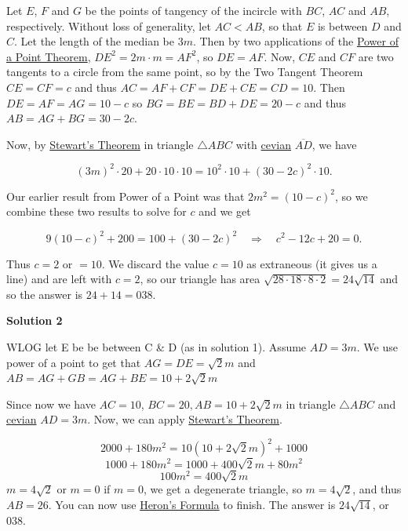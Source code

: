 \begin{enumerate}
 Let $E$, $F$ and $G$ be the points of tangency of the incircle with $BC$, $AC$ and $AB$, respectively.  Without loss of generality, let $AC < AB$, so that $E$ is between $D$ and $C$.  Let the length of the median be $3m$.  Then by two applications of the \href{https://artofproblemsolving.com/wiki/index.php?title=Power\_of\_a\_Point\_Theorem}{Power of a Point Theorem}, $DE^2 = 2m \cdot m = AF^2$, so $DE = AF$.  Now, $CE$ and $CF$ are two tangents to a circle from the same point, so by the Two Tangent Theorem $CE = CF = c$ and thus $AC = AF + CF = DE + CE = CD = 10$.  Then $DE = AF = AG = 10 - c$ so $BG = BE = BD + DE = 20 - c$ and thus $AB = AG + BG = 30 - 2c$.

 Now, by \href{https://artofproblemsolving.com/wiki/index.php?title=Stewart\%27s\_Theorem}{Stewart's Theorem} in triangle $\triangle ABC$ with \href{https://artofproblemsolving.com/wiki/index.php?title=Cevian}{cevian} $\overline{AD}$, we have

 
 \[(3m)^2\cdot 20 + 20\cdot10\cdot10 = 10^2\cdot10 + (30 - 2c)^2\cdot 10.\]

 Our earlier result from Power of a Point was that $2m^2 = (10 - c)^2$, so we combine these two results to solve for $c$ and we get

 
 \[9(10 - c)^2 + 200 = 100 + (30 - 2c)^2 \quad \Longrightarrow \quad c^2 - 12c + 20 = 0.\]

 Thus $c = 2$ or $= 10$.  We discard the value $c = 10$ as extraneous (it gives us a line) and are left with $c = 2$, so our triangle has area $\sqrt{28 \cdot 18 \cdot 8 \cdot 2} = 24\sqrt{14}$ and so the answer is $24 + 14 = \boxed{038}$.

 



\textbf{Solution 2}

WLOG let E be be between C & D (as in solution 1). Assume $AD = 3m$. We use power of a point to get that $AG = DE = \sqrt{2}m$ and  $AB = AG + GB = AG + BE = 10+2\sqrt{2} m$ 

 Since now we have $AC = 10$, $BC = 20, AB = 10+2\sqrt{2} m$ in triangle $\triangle ABC$ and \href{https://artofproblemsolving.com/wiki/index.php?title=Cevian}{cevian} $AD = 3m$.  Now, we can apply \href{https://artofproblemsolving.com/wiki/index.php?title=Stewart\%27s\_Theorem}{Stewart's Theorem}.

 
 \[2000 + 180 m^2 = 10(10+2\sqrt{2}m)^{2} + 1000\]
 \[1000 + 180 m^2 = 1000 + 400\sqrt{2}m + 80 m^{2}\]
 \[100 m^2 = 400\sqrt{2}m\]
$m = 4\sqrt{2}$ or $m = 0$ if $m = 0$, we get a degenerate triangle, so $m = 4\sqrt{2}$, and thus $AB = 26$. You can now use \href{https://artofproblemsolving.com/wiki/index.php?title=Heron\%27s\_Formula}{Heron's Formula} to finish. The answer is $24 \sqrt{14}$, or $\boxed{038}$.


\end{enumerate}
